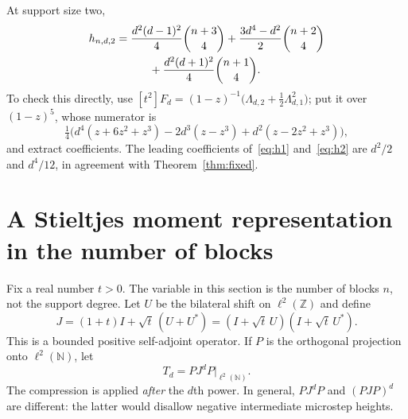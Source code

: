 \documentclass[11pt]{article}
\numberwithin{equation}{section}
\theoremstyle{definition}
\newcommand{\N}{\mathbb N}
\newcommand{\Z}{\mathbb Z}
\begin{document}
At support size two,
\begin{align}
 h_{n,d,2}
 &=\frac{d^2(d-1)^2}{4}\binom{n+3}{4}
   +\frac{3d^4-d^2}{2}\binom{n+2}{4}\notag\\
 &\hspace{3em}+\frac{d^2(d+1)^2}{4}\binom{n+1}{4}.
 \label{eq:h2}
\end{align}
To check this directly, use
$[t^2]F_d=(1-z)^{-1}\bigl(\Lambda_{d,2}+\tfrac12\Lambda_{d,1}^2\bigr)$; put it
over $(1-z)^5$, whose numerator is
\[
 \tfrac14\bigl(d^4(z+6z^2+z^3)-2d^3(z-z^3)+d^2(z-2z^2+z^3)\bigr),
\]
and extract coefficients. The leading coefficients of~\eqref{eq:h1}
and~\eqref{eq:h2} are $d^2/2$ and $d^4/12$, in agreement with
Theorem~\ref{thm:fixed}.

\section{A Stieltjes moment representation in the number of blocks}
\label{sec:moments}

Fix a real number $t>0$. The variable in this section is the number of
blocks $n$, not the support degree. Let $U$ be the bilateral shift on
$\ell^2(\Z)$ and define
\begin{equation}
 J=(1+t)I+\sqrt t\,(U+U^*)
    =(I+\sqrt t\,U)(I+\sqrt t\,U^*).
 \label{eq:J}
\end{equation}
This is a bounded positive self-adjoint operator. If $P$ is the orthogonal
projection onto $\ell^2(\N)$, let
\begin{equation}
 T_d=PJ^dP\big|_{\ell^2(\N)}.\label{eq:compression}
\end{equation}
The compression is applied \emph{after} the $d$th power. In general,
$PJ^dP$ and $(PJP)^d$ are different: the latter would disallow negative
intermediate microstep heights.
\end{document}
